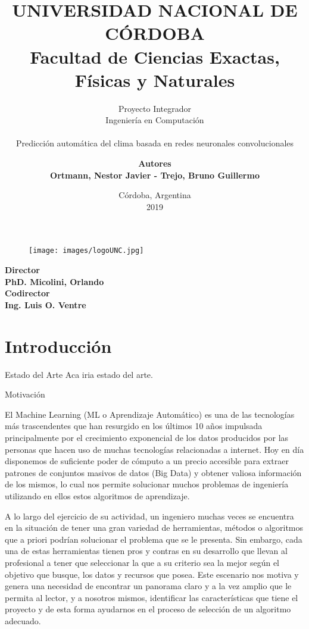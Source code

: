 \documentclass{scrartcl}
\title
{
	\Huge UNIVERSIDAD NACIONAL DE CÓRDOBA \\
	\vspace{1cm} \LARGE Facultad de Ciencias Exactas, Físicas y Naturales
}
\subtitle
{
	\vspace{1cm} \large   Proyecto Integrador \\
	Ingeniería en Computación \\~\\
	Predicción automática del clima basada en redes neuronales convolucionales
	\vspace{1cm}
}
\author
{
	\textbf{Autores}\\
	\textbf{Ortmann, Nestor Javier - Trejo, Bruno Guillermo}\\
}
\date{Córdoba, Argentina \\ 2019}
\begin{document}
	\maketitle
	\thispagestyle{empty}
	 
	\begin{figure}[t!]
		\begin{center}
			\texttt{[image: images/logoUNC.jpg]}
		\end{center}
	\end{figure}
	
	\begin{center}
	\large\textbf{Director\\PhD. Micolini, Orlando\\Codirector\\Ing. Luis O. Ventre}
	\end{center}
	\cleardoublepage
	
	\tableofcontents%
	\cleardoublepage
	
	\section{Introducción}
		\begin{subsection}{Estado del Arte}
			Aca iria estado del arte.     
		\end{subsection}
		
		\begin{subsection}{Motivación}

			\medskip El Machine Learning (ML o Aprendizaje Automático) es una de las tecnologías más trascendentes 
			que han resurgido en los últimos 10 años impulsada principalmente por el crecimiento exponencial
			de los datos producidos por las personas que hacen uso de muchas tecnologías relacionadas a internet.\cite{ortega}
			Hoy en día disponemos de suficiente poder de cómputo a un precio accesible para extraer patrones de 
			conjuntos masivos de datos (Big Data) y obtener valiosa información de los mismos, lo cual 
			nos permite solucionar muchos problemas de ingeniería utilizando en ellos estos algoritmos de aprendizaje.
			
			\medskip A lo largo del ejercicio de su actividad, un ingeniero muchas veces se encuentra en la situación de tener
			una gran variedad de herramientas, 
			métodos o algoritmos que a priori podrían solucionar el problema que se le presenta. 
			Sin embargo, cada una de estas herramientas tienen pros y contras 
			en su desarrollo que llevan al profesional a tener que seleccionar la que a su criterio sea la mejor según
			el objetivo que busque, los datos y recursos que posea.
			Este escenario nos motiva y genera una necesidad de encontrar un panorama claro y a la vez amplio que le 
			permita al lector, y a nosotros mismos, identificar las características que tiene el proyecto y de esta 
			forma ayudarnos en el proceso de selección de un algoritmo adecuado.
		\end{subsection}
		
\end{document}
